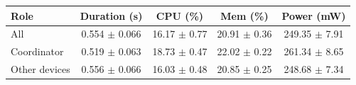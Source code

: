\begin{tabular}{lcccc}
\hline
\textbf{Role} & \textbf{Duration (s)} & \textbf{CPU (\%)} & \textbf{Mem (\%)} & \textbf{Power (mW)} \\
\hline
All & 0.554 $\pm$ 0.066 & 16.17 $\pm$ 0.77 & 20.91 $\pm$ 0.36 & 249.35 $\pm$ 7.91 \\
Coordinator & 0.519 $\pm$ 0.063 & 18.73 $\pm$ 0.47 & 22.02 $\pm$ 0.22 & 261.34 $\pm$ 8.65 \\
Other devices & 0.556 $\pm$ 0.066 & 16.03 $\pm$ 0.48 & 20.85 $\pm$ 0.25 & 248.68 $\pm$ 7.34 \\
\hline
\end{tabular}

